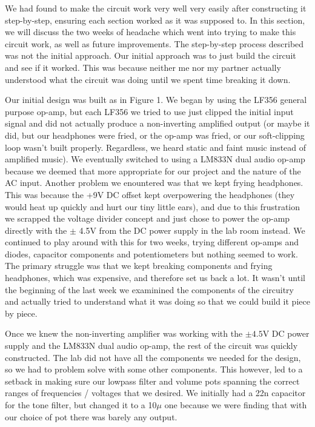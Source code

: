 \documentclass[11pt]{article}
\begin{document}
We had found to make the circuit work very well very easily after constructing it step-by-step, ensuring each section worked as it was supposed to. In this section, we will discuss the two weeks of headache which went into trying to make this circuit work, as well as future improvements. 
The step-by-step process described was not the initial approach. Our initial approach was to just build the circuit and see if it worked. This was because neither me nor my partner actually understood what the circuit was doing until we spent time breaking it down. 

Our initial design was built as in Figure 1. We began by using the LF356 general purpose op-amp, but each LF356 we tried to use just clipped the initial input signal and did not actually produce a non-inverting amplified output (or maybe it did, but our headphones were fried, or the op-amp was fried, or our soft-clipping loop wasn't built properly. Regardless, we heard static and faint music instead of amplified music). We eventually switched to using a LM833N dual audio op-amp because we deemed that more appropriate for our project and the nature of the AC input. Another problem we enountered was that we kept frying headphones. This was because the +9V DC offset kept overpowering the headphones (they would heat up quickly and hurt our tiny little ears), and due to this frustration we scrapped the voltage divider concept and just chose to power the op-amp directly with the $\pm$ 4.5V from the DC power supply in the lab room instead.
We continued to play around with this for two weeks, trying different op-amps and diodes, capacitor components and potentiometers but nothing seemed to work. The primary struggle was that we kept breaking components and frying headphones, which was expensive, and therefore set us back a lot. It wasn't until the beginning of the last week we examinined the components of the circuitry and actually tried to understand what it was doing so that we could build it piece by piece. 

Once we knew the non-inverting amplifier was working with the $\pm4.5$V DC power supply and the LM833N dual audio op-amp, the rest of the circuit was quickly constructed. The lab did not have all the components we needed for the design, so we had to problem solve with some other components. This however, led to a setback in making sure our lowpass filter and volume pots spanning the correct ranges of frequencies / voltages that we desired. We initially had a 22n capacitor for the tone filter, but changed it to a 10$\mu$ one because we were finding that with our choice of pot there was barely any output. 
\end{document}
